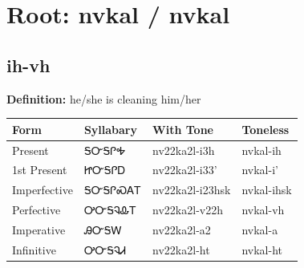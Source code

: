 \documentclass{article}%
\begin{document}
%
\normalsize%
\section*{Root: nvkal / nvkal}%
\subsection*{ih-vh}%
\textbf{Definition: }%
he/she is cleaning him/her%
\\[0.5em]%
\begin{tabular}{|l|l|l|l|}%
\hline%
\textbf{Form}&\textbf{Syllabary}&\textbf{With Tone}&\textbf{Toneless}\\%
\hline%
Present&ᎦᏅᎦᎵᎭ&nv22ka2l{-}i3h&nvkal{-}ih\\%
1st Present&ᏥᏅᎦᎵᎠ&nv22ka2l{-}i33'&nvkal{-}i'\\%
Imperfective&ᎦᏅᎦᎵᏍᎪᎢ&nv22ka2l{-}i23hsk&nvkal{-}ihsk\\%
Perfective&ᎤᏅᎦᎸᎲᎢ&nv22ka2l{-}v22h&nvkal{-}vh\\%
Imperative&ᎯᏅᎦᎳ&nv22ka2l{-}a2&nvkal{-}a\\%
Infinitive&ᎤᏅᎦᎸᏗ&nv22ka2l{-}ht&nvkal{-}ht\\%
\hline%
\end{tabular}%
\\[1em]%
\end{document}
